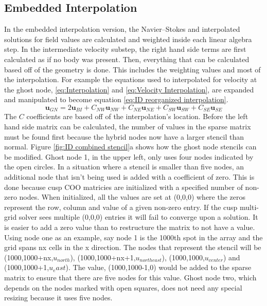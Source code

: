 \documentclass[onehalf,11pt]{beavtex}
\begin{document}
\subsection{Embedded Interpolation}
\label{sec:ID embedded}
In the embedded interpolation version, the Navier--Stokes and interpolated solutions for field values are calculated and weighted inside each linear algebra step.
In the intermediate velocity substep, the right hand side terms are first calculated as if no body was present.
Then, everything that can be calculated based off of the geometry is done.
This includes the weighting values and most of the interpolation.
For example the equations used to interpolated for velocity at the ghost node, \eqref{eq:Interpolation} and \eqref{eq:Velocity Interpolation}, are expanded and manipulated to become equation \eqref{eq:ID reorganized interpolation}.
\begin{equation}
\textbf{u}_{GN} = 2\textbf{u}_{BI} + C_{NW}\textbf{u}_{NW} + C_{NE}\textbf{u}_{NE} + C_{SW}\textbf{u}_{SW} + C_{SE}\textbf{u}_{SE}\label{eq:ID reorganized interpolation}
\end{equation}
The $C$ coefficients are based off of the interpolation's location.
Before the left hand side matrix can be calculated, the number of values in the sparse matrix must be found first because the hybrid nodes now have a larger stencil than normal. 
Figure \ref{fig:ID combined stencil}a shows how the ghost node stencils can be modified.
Ghost node 1, in the upper left, only uses four nodes indicated by the open circles. 
In a situation where a stencil is smaller than five nodes, an additional node that isn't being used is added with a coefficient of zero.
This is done because cusp COO matricies are initialized with a specified number of non-zero nodes.
When initialized, all the values are set at (0,0,0) where the zeros represent the row, column and value of a given non-zero entry.
If the cusp multi-grid solver sees multiple (0,0,0) entries it will fail to converge upon a solution.
It is easier to add a zero value than to restructure the matrix to not have a value.
Using node one as an example, say node 1 is the 1000th spot in the array and the grid spans nx cells in the x direction.
The nodes that represent the stencil will be (1000,1000+nx,$u_{north}$), (1000,1000+nx+1,$u_{north east}$), (1000,1000,$u_{center}$) and (1000,1000+1,$u_east$).
The value, (1000,1000-1,0) would be added to the sparse matrix to ensure that there are five nodes for this value.
Ghost node two, which depends on the nodes marked with open squares, does not need any special resizing because it uses five nodes.
\end{document}
